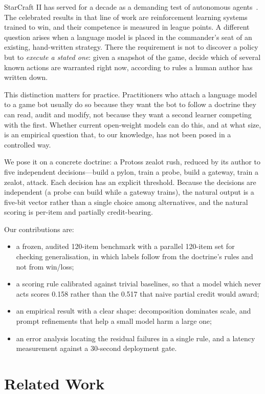 \documentclass[journal]{IEEEtran}
\begin{document}
StarCraft II has served for a decade as a demanding test of autonomous agents~\cite{vinyals2019}.
The celebrated results in that line of work are reinforcement learning systems trained to win,
and their competence is measured in league points. A different question arises when a language
model is placed in the commander's seat of an existing, hand-written strategy. There the
requirement is not to discover a policy but to \emph{execute a stated one}: given a snapshot of
the game, decide which of several known actions are warranted right now, according to rules a
human author has written down.

This distinction matters for practice. Practitioners who attach a language model to a game bot
usually do so because they want the bot to follow a doctrine they can read, audit and modify,
not because they want a second learner competing with the first. Whether current open-weight
models can do this, and at what size, is an empirical question that, to our knowledge, has not
been posed in a controlled way.

We pose it on a concrete doctrine: a Protoss zealot rush, reduced by its author to five
independent decisions---build a pylon, train a probe, build a gateway, train a zealot, attack.
Each decision has an explicit threshold. Because the decisions are independent (a probe can
build while a gateway trains), the natural output is a five-bit vector rather than a single
choice among alternatives, and the natural scoring is per-item and partially credit-bearing.

Our contributions are:
\begin{itemize}
\item a frozen, audited 120-item benchmark with a parallel 120-item set for checking
generalisation, in which labels follow from the doctrine's rules and not from win/loss;
\item a scoring rule calibrated against trivial baselines, so that a model which never acts
scores 0.158 rather than the 0.517 that naive partial credit would award;
\item an empirical result with a clear shape: decomposition dominates scale, and prompt
refinements that help a small model harm a large one;
\item an error analysis locating the residual failures in a single rule, and a latency
measurement against a 30-second deployment gate.
\end{itemize}

\section{Related Work}
\end{document}
